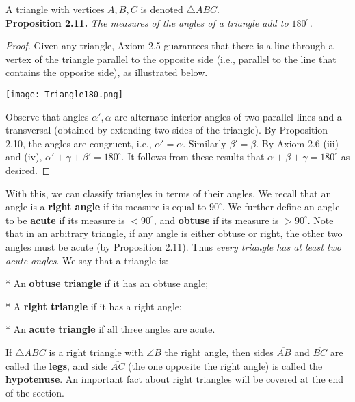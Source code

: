 \documentclass[leqno]{book}
\begin{document}
A triangle with vertices $A,B,C$ is denoted $\triangle ABC$.\\

\noindent\textbf{Proposition 2.11.} \emph{The measures of the angles of a triangle add to $180^\circ$.}
\begin{proof}
Given any triangle, Axiom 2.5 guarantees that there is a line through a vertex of the triangle parallel to the opposite side (i.e., parallel to the line that contains the opposite side), as illustrated below.
\begin{center}\texttt{[image: Triangle180.png]}\end{center}
Observe that angles $\alpha',\alpha$ are alternate interior angles of two parallel lines and a transversal (obtained by extending two sides of the triangle).  By Proposition 2.10, the angles are congruent, i.e., $\alpha'=\alpha$.  Similarly $\beta'=\beta$.  By Axiom 2.6 (iii) and (iv), $\alpha'+\gamma+\beta'=180^\circ$.  It follows from these results that $\alpha+\beta+\gamma=180^\circ$ as desired.
\end{proof}

With this, we can classify triangles in terms of their angles.  We recall that an angle is a \textbf{right angle} if its measure is equal to $90^\circ$.  We further define an angle to be \textbf{acute} if its measure is $<90^\circ$, and \textbf{obtuse} if its measure is $>90^\circ$.  Note that in an arbitrary triangle, if any angle is either obtuse or right, the other two angles must be acute (by Proposition 2.11).  Thus \emph{every triangle has at least two acute angles}.  We say that a triangle is:

* An \textbf{obtuse triangle} if it has an obtuse angle;

* A \textbf{right triangle} if it has a right angle;

* An \textbf{acute triangle} if all three angles are acute.

If $\triangle ABC$ is a right triangle with $\angle B$ the right angle, then sides $\overline{AB}$ and $\overline{BC}$ are called the \textbf{legs}, and side $\overline{AC}$ (the one opposite the right angle) is called the \textbf{hypotenuse}.  An important fact about right triangles will be covered at the end of the section.
\end{document}
